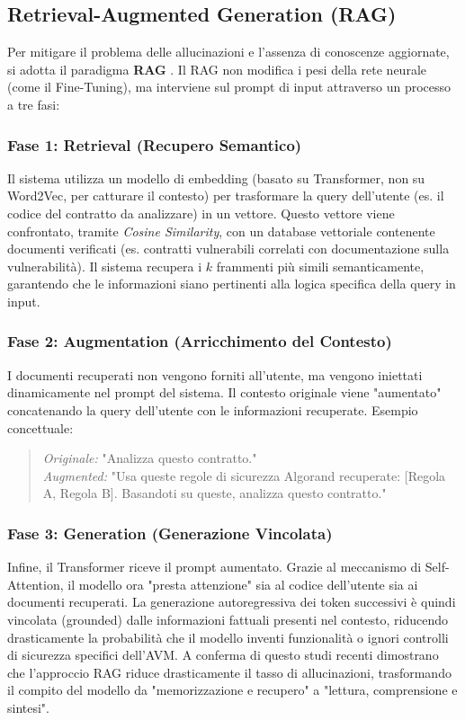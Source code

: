 \subsection{Retrieval-Augmented Generation (RAG)}
\label{sec:rag_workflow}
Per mitigare il problema delle allucinazioni e l'assenza di conoscenze aggiornate, si adotta il paradigma \textbf{RAG} \cite{lewis2020rag}. 
Il RAG non modifica i pesi della rete neurale (come il Fine-Tuning), ma interviene sul prompt di input attraverso un processo a tre fasi:

\subsubsection{Fase 1: Retrieval (Recupero Semantico)}
Il sistema utilizza un modello di embedding (basato su Transformer, non su Word2Vec, per catturare il contesto) per trasformare la query dell'utente (es. il codice del contratto da analizzare) in un vettore. 
Questo vettore viene confrontato, tramite \textit{Cosine Similarity}, con un database vettoriale contenente documenti verificati (es. contratti vulnerabili correlati con documentazione sulla vulnerabilità). Il sistema recupera i $k$ frammenti più simili semanticamente, garantendo che le informazioni siano pertinenti alla logica specifica della query in input.

\subsubsection{Fase 2: Augmentation (Arricchimento del Contesto)}
I documenti recuperati non vengono forniti all'utente, ma vengono iniettati dinamicamente nel prompt del sistema. Il contesto originale viene "aumentato" concatenando la query dell'utente con le informazioni recuperate.
Esempio concettuale:
\begin{quote}
    \textit{Originale:} "Analizza questo contratto." \\
    \textit{Augmented:} "Usa queste regole di sicurezza Algorand recuperate: [Regola A, Regola B]. Basandoti su queste, analizza questo contratto."
\end{quote}

\subsubsection{Fase 3: Generation (Generazione Vincolata)}
Infine, il Transformer riceve il prompt aumentato. Grazie al meccanismo di Self-Attention, il modello ora "presta attenzione" sia al codice dell'utente sia ai documenti recuperati. La generazione autoregressiva dei token successivi è quindi vincolata (grounded) dalle informazioni fattuali presenti nel contesto, riducendo drasticamente la probabilità che il modello inventi funzionalità o ignori controlli di sicurezza specifici dell'AVM. A conferma di questo studi recenti \cite{shuster2021retrieval} dimostrano che l'approccio RAG riduce drasticamente il tasso di allucinazioni, trasformando il compito del modello da "memorizzazione e recupero" a "lettura, comprensione e sintesi".

